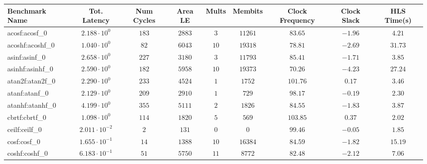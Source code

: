 \begin{tabular}{|l|c|c|c|c|c|c|c|c|}
\hline
Benchmark Name               & Tot. Latency            & Num Cycles & Area LE   & Mults   & Membits    & Clock Frequency & Clock Slack & HLS Time(s) \\
\hline
acosf:acosf\_0               & $ 2.188 \cdot 10^{0}  $ & $ 183    $ & $ 2883  $ & $ 3   $ & $ 11261  $ & $ 83.65       $ & $ -1.96   $ & $ 4.21    $ \\
acoshf:acoshf\_0             & $ 1.040 \cdot 10^{0}  $ & $ 82     $ & $ 6043  $ & $ 10  $ & $ 19318  $ & $ 78.81       $ & $ -2.69   $ & $ 31.73   $ \\
asinf:asinf\_0               & $ 2.658 \cdot 10^{0}  $ & $ 227    $ & $ 3180  $ & $ 3   $ & $ 11793  $ & $ 85.41       $ & $ -1.71   $ & $ 3.85    $ \\
asinhf:asinhf\_0             & $ 2.590 \cdot 10^{0}  $ & $ 182    $ & $ 5958  $ & $ 10  $ & $ 19373  $ & $ 70.26       $ & $ -4.23   $ & $ 27.24   $ \\
atan2f:atan2f\_0             & $ 2.290 \cdot 10^{0}  $ & $ 233    $ & $ 4524  $ & $ 1   $ & $ 1752   $ & $ 101.76      $ & $ 0.17    $ & $ 3.46    $ \\
atanf:atanf\_0               & $ 2.129 \cdot 10^{0}  $ & $ 209    $ & $ 2910  $ & $ 1   $ & $ 729    $ & $ 98.17       $ & $ -0.19   $ & $ 2.30    $ \\
atanhf:atanhf\_0             & $ 4.199 \cdot 10^{0}  $ & $ 355    $ & $ 5111  $ & $ 2   $ & $ 1826   $ & $ 84.55       $ & $ -1.83   $ & $ 3.87    $ \\
cbrtf:cbrtf\_0               & $ 1.098 \cdot 10^{0}  $ & $ 114    $ & $ 1820  $ & $ 5   $ & $ 569    $ & $ 103.85      $ & $ 0.37    $ & $ 2.02    $ \\
ceilf:ceilf\_0               & $ 2.011 \cdot 10^{-2} $ & $ 2      $ & $ 131   $ & $ 0   $ & $ 0      $ & $ 99.46       $ & $ -0.05   $ & $ 1.85    $ \\
cosf:cosf\_0                 & $ 1.655 \cdot 10^{-1} $ & $ 14     $ & $ 1388  $ & $ 10  $ & $ 16384  $ & $ 84.59       $ & $ -1.82   $ & $ 15.19   $ \\
coshf:coshf\_0               & $ 6.183 \cdot 10^{-1} $ & $ 51     $ & $ 5750  $ & $ 11  $ & $ 8772   $ & $ 82.48       $ & $ -2.12   $ & $ 7.06    $ \\

\end{tabular}
